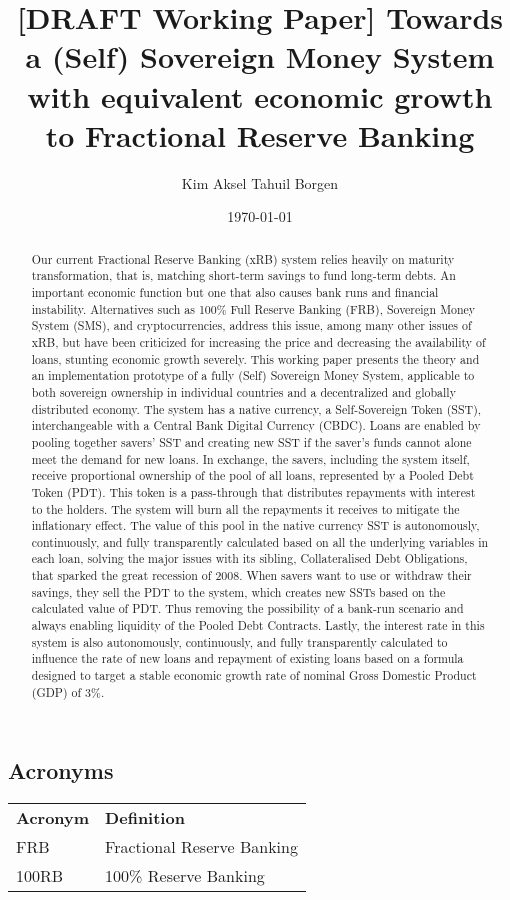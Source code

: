 \documentclass{article}
\title{[DRAFT Working Paper] Towards a (Self) Sovereign Money System with equivalent economic growth to Fractional Reserve Banking}
\author{Kim Aksel Tahuil Borgen}
\date{\today}
\begin{document}
\maketitle
\begin{abstract}
    Our current Fractional Reserve Banking (xRB) system relies heavily on maturity transformation, that is, matching short-term savings to fund long-term debts. An important economic function but one that also causes bank runs and financial instability. Alternatives such as 100\% Full Reserve Banking (FRB), Sovereign Money System (SMS), and cryptocurrencies, address this issue, among many other issues of xRB, but have been criticized for increasing the price and decreasing the availability of loans, stunting economic growth severely. This working paper presents the theory and an implementation prototype of a fully (Self) Sovereign Money System, applicable to both sovereign ownership in individual countries and a decentralized and globally distributed economy. The system has a native currency, a Self-Sovereign Token (SST), interchangeable with a Central Bank Digital Currency (CBDC). Loans are enabled by pooling together savers' SST and creating new SST if the saver's funds cannot alone meet the demand for new loans. In exchange, the savers, including the system itself, receive proportional ownership of the pool of all loans, represented by a Pooled Debt Token (PDT). This token is a pass-through that distributes repayments with interest to the holders. The system will burn all the repayments it receives to mitigate the inflationary effect. The value of this pool in the native currency SST is autonomously, continuously, and fully transparently calculated based on all the underlying variables in each loan, solving the major issues with its sibling, Collateralised Debt Obligations, that sparked the great recession of 2008. When savers want to use or withdraw their savings, they sell the PDT to the system, which creates new SSTs based on the calculated value of PDT. Thus removing the possibility of a bank-run scenario and always enabling liquidity of the Pooled Debt Contracts. Lastly, the interest rate in this system is also autonomously, continuously, and fully transparently calculated to influence the rate of new loans and repayment of existing loans based on a formula designed to target a stable economic growth rate of nominal Gross Domestic Product (GDP) of 3\%.  
\end{abstract}

\subsection{Acronyms}

\begin{tabular}{ll}
\textbf{Acronym} & \textbf{Definition} \\
FRB & Fractional Reserve Banking \\
100RB & 100\% Reserve Banking \\
\end{tabular}





\printbibliography
\end{document}
